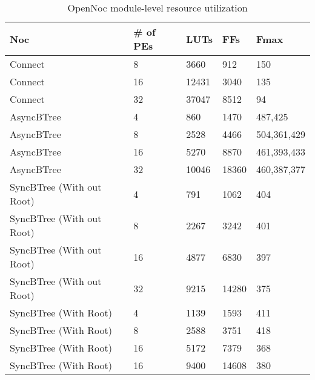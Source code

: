 \begin{table}[!t]
  \centering
  \caption{OpenNoc module-level resource utilization} 
  \begin{tabular}{l|l|l|l|l}
      \toprule
      Noc & \# of PEs & LUTs & FFs & Fmax \\
      \midrule
      \midrule
      Connect & 8      & 3660 & 912 & 150  \\
      Connect & 16     & 12431 & 3040 & 135 \\
      Connect & 32     & 37047 & 8512 & 94 \\    
      \midrule
      AsyncBTree & 4         & 860  & 1470 & 487,425\\
      AsyncBTree & 8         & 2528 & 4466 & 504,361,429\\
      AsyncBTree & 16        & 5270 & 8870 & 461,393,433 \\
      AsyncBTree & 32        & 10046 & 18360 & 460,387,377\\
      \midrule
      SyncBTree (With out Root) &  4         &  791 & 1062 & 404\\
      SyncBTree (With out Root) &  8         &  2267 & 3242 & 401\\
      SyncBTree (With out Root) &  16        &  4877 & 6830 & 397\\
      SyncBTree (With out Root) &  32        &  9215 & 14280 & 375\\
      \midrule      
      SyncBTree (With Root) &  4         &  1139 & 1593 & 411\\
      SyncBTree (With Root) &  8         &  2588 & 3751 & 418\\
      SyncBTree (With Root) &  16         &  5172 & 7379 & 368\\ 
      SyncBTree (With Root) &  16         &  9400 & 14608 & 380\\ 
      \bottomrule
    \end{tabular}
	\label{table:systemResourceConsumption}
\end{table}